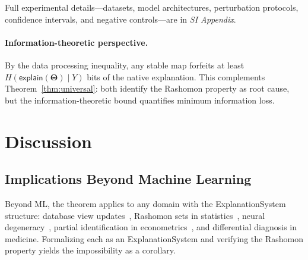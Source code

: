 \documentclass[twocolumn]{article}
\newcommand{\Params}{\mathbf{\Theta}}
\begin{document}
Full experimental details---datasets, model architectures, perturbation
protocols, confidence intervals, and negative controls---are in
\emph{SI Appendix}.


\paragraph{Information-theoretic perspective.}
By the data processing inequality, any stable map forfeits at least $H(\mathsf{explain}(\Params) \mid Y)$ bits of the native explanation. This complements Theorem~\ref{thm:universal}: both identify the Rashomon property as root cause, but the information-theoretic bound quantifies minimum information loss.


\section{Discussion}
\label{sec:discussion}

\subsection{Implications Beyond Machine Learning}

Beyond ML, the theorem applies to any domain with the ExplanationSystem
structure: database view updates~\cite{bancilhon1981update}, Rashomon sets
in statistics~\cite{fisher2019models}, neural
degeneracy~\cite{marder2006variability,edelman2001degeneracy}, partial
identification in econometrics~\cite{manski2003partial}, and differential
diagnosis in medicine. Formalizing each as an ExplanationSystem and
verifying the Rashomon property yields the impossibility as a corollary.
\end{document}
